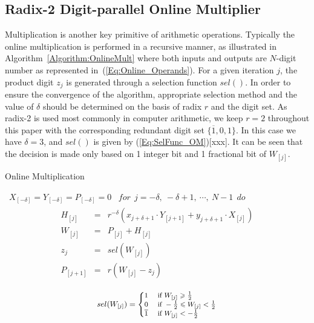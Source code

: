\documentclass{acm_proc_article-sp}
\begin{document}
\subsection{Radix-2 Digit-parallel Online Multiplier}
Multiplication is another key primitive of arithmetic operations. Typically the online multiplication is performed in a recursive manner, as illustrated in Algorithm~\ref{Algorithm:OnlineMult} where both inputs and outputs are $N$-digit number as represented in~(\ref{Eq:Online_Operands}). For a given iteration $j$, the product digit $z_j$ is generated through a selection function $sel()$. In order to ensure the convergence of the algorithm, appropriate selection method and the value of $\delta$ should be determined on the basis of radix $r$ and the digit set. As radix-2 is used most commonly in computer arithmetic, we keep $r=2$ throughout this paper with the corresponding redundant digit set $\{\overline{1},0,1\}$. In this case we have $\delta=3$, and $sel()$ is given by (\ref{Eq:SelFunc_OM})[xxx]. It can be seen that the decision is made only based on 1 integer bit and 1 fractional bit of $W_{[j]}$.
%
\begin{algorithm}[tbp]
  \caption{Online Multiplication}
  \begin{algorithmic}[1]
    \REQUIRE~$X_{[-\delta]}=Y_{[-\delta]}=P_{[-\delta]}=0$
    \ENSURE~$for~~ j=-\delta,~-\delta+1,~\cdots,~N-1 ~~do$
      \begin{eqnarray}\label{Eq:OnlineMult_General}
        \begin{matrix}
          H_{[j]}   & = & r^{-\delta}\left(x_{j+\delta+1}\cdot Y_{[j+1]}+y_{j+\delta+1}\cdot X_{[j]}\right)\\
          W_{[j]}   & = & P_{[j]} + H_{[j]}\\
          z_j       & = & sel(W_{[j]})\\
          P_{[j+1]} & = & r\left(W_{[j]}-z_j\right)
        \end{matrix}
      \end{eqnarray}
  \label{Algorithm:OnlineMult}
  \end{algorithmic}
\end{algorithm}
%
\begin{eqnarray}\label{Eq:SelFunc_OM}
\small
  sel(W_{[j]})=\begin{cases}
    1 & \text{ if } W_{[j]} \geqslant \frac{1}{2} \\
    0 & \text{ if } -\frac{1}{2}\leqslant W_{[j]}<\frac{1}{2} \\
    \overline{1} & \text{ if } W_{[j]}<-\frac{1}{2}
  \end{cases}
\normalsize
\end{eqnarray}
\end{document}
